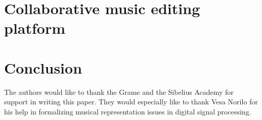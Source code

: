 \documentclass{article}
\begin{document}
\section{Collaborative music editing platform}\label{sec:collaborative-music-editing-platform}
\section{Conclusion}\label{sec:conclusion}
\begin{acknowledgments}
The authors would like to thank the Grame and the Sibelius Academy for
support in writing this paper. They would especially like to thank Vesa
Norilo for his help in formalizing musical representation issues in
digital signal processing.
\end{acknowledgments} 


\end{document}
